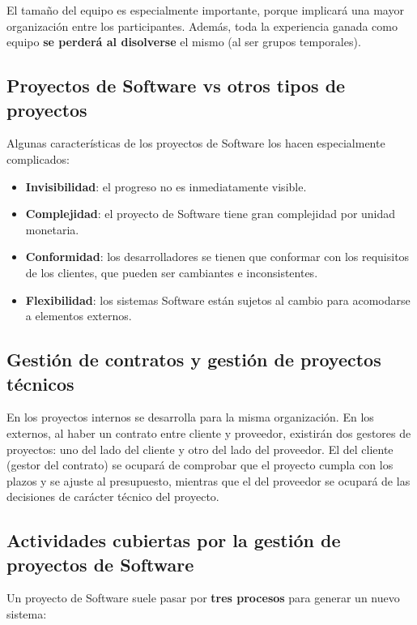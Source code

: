 \documentclass[12pt]{article}
\begin{document}
{El tamaño del equipo es especialmente importante, porque implicará una mayor organización entre los participantes. Además, toda la experiencia ganada como equipo \textbf{se perderá al disolverse} el mismo (al ser grupos temporales).}

\subsection{Proyectos de Software vs otros tipos de proyectos}
\label{1.4.0}

{Algunas características de los proyectos de Software los hacen especialmente complicados:}

\begin{itemize}
    \item {\textbf{Invisibilidad}: el progreso no es inmediatamente visible.}
    \item {\textbf{Complejidad}: el proyecto de Software tiene gran complejidad por unidad monetaria.}
    \item {\textbf{Conformidad}: los desarrolladores se tienen que conformar con los requisitos de los clientes, que pueden ser cambiantes e inconsistentes.}
    \item {\textbf{Flexibilidad}: los sistemas Software están sujetos al cambio para acomodarse a elementos externos.}
\end{itemize}

\subsection{Gestión de contratos y gestión de proyectos técnicos}
\label{1.5.0}

{En los proyectos internos se desarrolla para la misma organización. En los externos, al haber un contrato entre cliente y proveedor, existirán dos gestores de proyectos: uno del lado del cliente y otro del lado del proveedor. El del cliente (gestor del contrato) se ocupará de comprobar que el proyecto cumpla con los plazos y se ajuste al presupuesto, mientras que el del proveedor se ocupará de las decisiones de carácter técnico del proyecto.}

\subsection{Actividades cubiertas por la gestión de proyectos de Software}
\label{1.6.0}

{Un proyecto de Software suele pasar por \textbf{tres procesos} para generar un nuevo sistema:}
\end{document}
